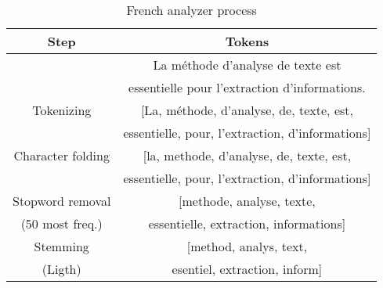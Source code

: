 \begin{table}[b]
    \caption{French analyzer process}
    \label{tab:french-analyzer}
    \centering
    \begin{tabular}{|c|c|}
        \toprule
        \textbf{Step} & \textbf{Tokens}\\
        \midrule
          & La méthode d'analyse de texte est\\ 
          & essentielle pour l'extraction d'informations.\\ 
         \midrule
         Tokenizing & [La, méthode, d'analyse, de, texte, est,\\
         & essentielle, pour, l'extraction, d'informations]\\
         \midrule
         Character folding & [la, methode, d'analyse, de, texte, est,\\
          & essentielle, pour, l'extraction, d'informations]\\
         \midrule
         Stopword removal & [methode, analyse, texte,\\
         (50 most freq.) & essentielle, extraction, informations]\\
         \midrule
         Stemming & [method, analys, text,\\
         (Ligth) & esentiel, extraction, inform]\\
        \bottomrule
    \end{tabular}
\end{table}